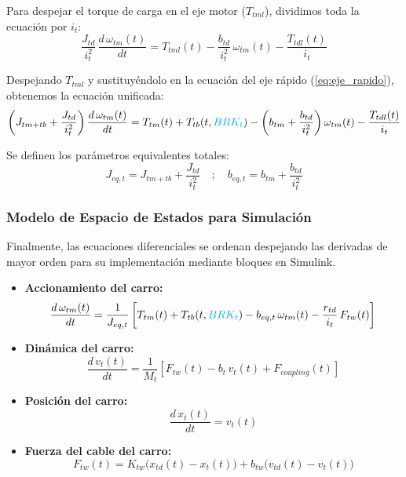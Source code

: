 \documentclass[11pt]{article}                                    %
\begin{document}
Para despejar el torque de carga en el eje motor ($T_{tml}$), dividimos toda la ecuación por $i_t$:
\begin{equation}
    \frac{J_{td}}{i_t^2}\, \frac{d \, \omega_{tm}(t)}{dt} = T_{tml}(t) - \frac{b_{td}}{i_t^2} \, \omega_{tm}(t) - \frac{T_{tdl}(t)}{i_t}
\end{equation}

Despejando $T_{tml}$ y sustituyéndolo en la ecuación del eje rápido (\ref{eq:eje_rapido}), obtenemos la ecuación unificada:
\begin{equation}
    \left( J_{tm+tb} + \frac{J_{td}}{i_t^2} \right) \frac{d \, \omega_{tm}(t)}{dt} = T_{tm}(t) + T_{tb}(t,\textcolor{cyan}{BRK_t}) - \left( b_{tm} + \frac{b_{td}}{i_t^2} \right) \omega_{tm}(t) - \frac{T_{tdl}(t)}{i_t}
\end{equation}

Se definen los parámetros equivalentes totales:
\begin{equation} \label{eq:parametros_eq}
    J_{eq,t} = J_{tm+tb} + \frac{J_{td}}{i_t^2} \quad ; \quad 
    b_{eq,t} = b_{tm} + \frac{b_{td}}{i_t^2}
\end{equation}

\subsubsection{Modelo de Espacio de Estados para Simulación}
Finalmente, las ecuaciones diferenciales se ordenan despejando las derivadas de mayor orden para su implementación mediante bloques en Simulink.
\begin{itemize}
    \item \textbf{Accionamiento del carro:}
    \begin{equation}
        \frac{d\,\omega_{tm}(t)}{dt}
        = \frac{1}{J_{eq,t}}
        \left[
            T_{tm}(t)
            + T_{tb}(t,\textcolor{cyan}{BRK_t})
            - b_{eq,t}\,\omega_{tm}(t)
            - \frac{r_{td}}{i_t}\,F_{tw}(t)
        \right]
        \label{accionamiento_carro}
    \end{equation}

    \item \textbf{Dinámica del carro:}
    \begin{equation}
        \frac{d\,v_t(t)}{dt}
        = \frac{1}{M_t}
        \left[
            F_{tw}(t)
            - b_t\,v_t(t)
            + F_{coupling}(t)
        \right]
        \label{eq:carro_dinamica}
    \end{equation}

    \item \textbf{Posición del carro:}
    \begin{equation}
        \frac{d\,x_t(t)}{dt} = v_t(t)
        \label{eq:carro_posicion}
    \end{equation}

    \item \textbf{Fuerza del cable del carro:}
    \begin{equation}
        F_{tw}(t)
        = K_{tw}\bigl(x_{td}(t) - x_t(t)\bigr)
        + b_{tw}\bigl(v_{td}(t) - v_t(t)\bigr)
    \end{equation}
\end{itemize}
        
\end{document}
